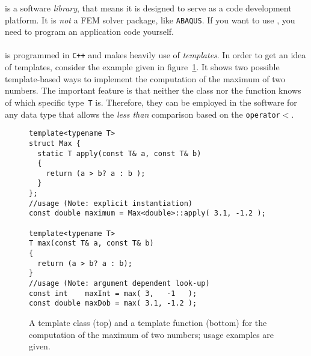 



\IS{} is a software \emph{library}, that means it is designed to serve
as a code development platform. It is \emph{not} a FEM solver package,
like \texttt{ABAQUS}. If you want to use \IS, you need to program an
application code yourself.\\
\\
\IS{} is programmed in \texttt{C++} and makes heavily use of
\emph{templates}. In order to get an idea of templates, consider the
example given in figure~\ref{fig:template}. It shows two possible
template-based ways to implement the computation of the maximum of two
numbers. The important feature is that neither the class nor the
function knows of which specific type~\texttt{T} is. Therefore, they can
be employed in the software for any data type that allows the
\emph{less than} comparison based on the \texttt{operator$<$}.

\begin{figure}[htbp]
  \centering
\begin{lstlisting}
template<typename T> 
struct Max {
  static T apply(const T& a, const T& b)
  { 
    return (a > b? a : b );
  }
};
//usage (Note: explicit instantiation)
const double maximum = Max<double>::apply( 3.1, -1.2 );

template<typename T>
T max(const T& a, const T& b)
{
  return (a > b? a : b);
}
//usage (Note: argument dependent look-up)
const int    maxInt = max( 3,   -1   );
const double maxDob = max( 3.1, -1.2 );
\end{lstlisting}

  \caption{A template class (top) and a template function (bottom) for
  the computation of the maximum of two numbers; usage examples are given.}
  \label{fig:template}
\end{figure}

